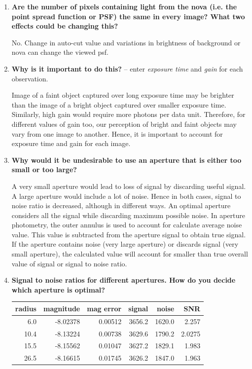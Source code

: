 \documentclass{article}
\begin{document}
\begin{enumerate}
		\item \textbf{Are the number of pixels containing light from the nova (i.e. the point spread function or PSF) the
			same in every image? What two effects could be changing this?}
		
		No. Change in auto-cut value and variations in brightness of background or nova can change the viewed psf.
		
		\item \textbf{Why is it important to do this?} -- enter \emph{exposure time} and \emph{gain} for each observation.
		
		Image of a faint object captured over long exposure time may be brighter than the image of a bright object captured over smaller exposure time. Similarly, high gain would require more photons per data unit. Therefore, for different values of gain too, our perception of bright and faint objects may vary from one image to another. Hence, it is important to account for exposure time and gain for each image.
		
		\item \textbf{Why would it be undesirable to use an aperture that is either too small or too large?}
		
		A very small aperture would lead to loss of signal by discarding useful signal. A large aperture would include a lot of noise. Hence in both cases, signal to noise ratio is decreased, although in different ways. An optimal aperture considers all the signal while discarding maximum possible noise. In aperture photometry, the outer annulus is used to account for calculate average noise value. This value is subtracted from the aperture signal to obtain true signal. If the aperture contains noise (very large aperture) or discards signal (very small aperture), the calculated value will account for smaller than true overall value of signal or signal to noise ratio. 
		
		\item \textbf{Signal to noise ratios for different apertures. How do you decide which aperture is optimal?}
		
		\begin{table} [h]
			\centering
			\begin{tabular} {r r r r r r}
				\toprule
				\textbf{radius} & \textbf{magnitude} &\textbf{mag error} & \textbf{signal} & \textbf{noise} &\textbf{SNR} \\
				\midrule
				6.0 & -8.02378 & 0.00512 & 3656.2 & 1620.0 & 2.257 \\
				10.4 & -8.13224 & 0.00738 & 3629.6 & 1790.2 & 2.0275 \\
				15.5 & -8.15562 & 0.01047 & 3627.2 & 1829.1 & 1.983 \\
				26.5 & -8.16615 & 0.01745 & 3626.2 & 1847.0 & 1.963 \\
				\bottomrule
			\end{tabular}
		\end{table}
		

\end{enumerate}
\end{document}
